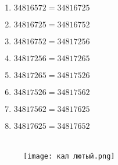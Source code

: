     \section{}

    \begin{enumerate}
        \item $34816572 = 34816725$
        \item $34816725 = 34816752$
        \item $34816752 = 34817256$
        \item $34817256 = 34817265$
        \item $34817265 = 34817526$
        \item $34817526 = 34817562$
        \item $34817562 = 34817625$
        \item $34817625 = 34817652$
    \end{enumerate}

    \newpage

    \section{}

    \begin{figure}[h]
        \centering
        \texttt{[image: кал лютый.png]}

        \end{figure}

        
        
    

